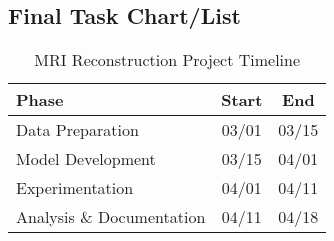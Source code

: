 \documentclass[
	letterpaper, %
]{jdf}
\begin{document}
\subsection{Final Task Chart/List}

\begin{table}[h]
\centering
\begin{tabular}{|l|c|c|}
\hline
\textbf{Phase} & \textbf{Start} & \textbf{End} \\ \hline
Data Preparation & 03/01 & 03/15 \\ \hline
Model Development & 03/15 & 04/01 \\ \hline
Experimentation & 04/01 & 04/11 \\ \hline
Analysis \& Documentation & 04/11 & 04/18 \\ \hline
\end{tabular}
\caption{MRI Reconstruction Project Timeline}
\label{tab:timeline}
\end{table}
\end{document}
